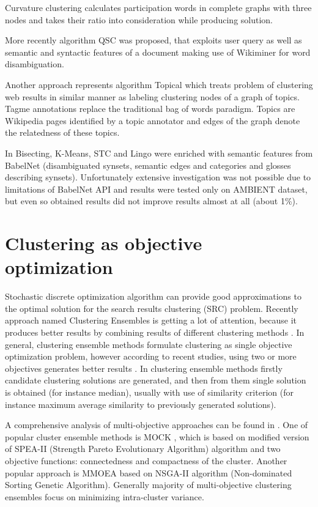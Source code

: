 \documentclass[a4paper, 12pt, oneside]{Thesis} %
\begin{document}
Curvature clustering calculates participation words in complete graphs with three nodes and takes their ratio into consideration while producing solution.

More recently \cite{wahid2013exploiting} algorithm QSC was proposed, that exploits user query as well as semantic and syntactic features of a document making use of Wikiminer \cite{milne2013open} for word disambiguation. 

Another approach represents algorithm Topical \cite{scaiella2012topical} which treats problem of clustering web results in similar manner as labeling clustering nodes of a graph of topics. Tagme annotations replace the traditional bag of words paradigm. Topics are Wikipedia pages identified by a topic annotator and edges of the graph denote the relatedness of these topics. 

In \cite{kozlowskiweb} Bisecting, K-Means, STC and Lingo were enriched with semantic features from BabelNet (disambiguated synsets, semantic edges and categories and glosses describing synsets). Unfortunately extensive investigation was not possible due to limitations of BabelNet API and results were tested only on AMBIENT dataset, but even so obtained results did not improve results almost at all (about 1\%).

\section{Clustering as objective optimization} Stochastic discrete optimization algorithm can provide good approximations to the optimal solution for the search results clustering (SRC) problem. Recently approach named Clustering Ensembles is getting a lot of attention, because it produces better results by combining results of different clustering methods \cite{vega2011survey}. In general, clustering ensemble methods formulate clustering as single objective optimization problem, however according to recent studies, using two or more objectives generates better results \cite{strehl2002cluster}. In clustering ensemble methods firstly candidate clustering solutions are generated, and then from them single solution is obtained (for instance median), usually with use of similarity criterion (for instance maximum average similarity to previously generated solutions). 

A comprehensive analysis of multi-objective approaches can be found in \cite{nanda2014survey}. One of popular cluster ensemble methods is MOCK \cite{handl2013evidence}, which is based on modified version of SPEA-II (Strength Pareto Evolutionary Algorithm) algorithm and two objective functions: connectedness and compactness of the cluster. Another popular approach is MMOEA \cite{wahid2015multi} based on NSGA-II algorithm (Non-dominated Sorting Genetic Algorithm). Generally majority of multi-objective clustering ensembles focus on minimizing intra-cluster variance.
\end{document}
